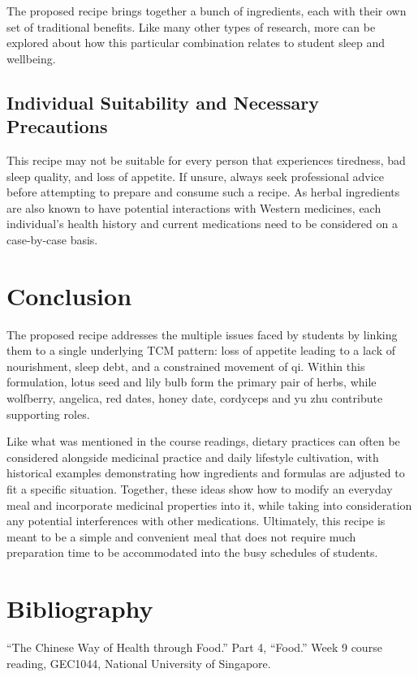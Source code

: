\documentclass[12pt,a4paper]{article}
\begin{document}
The proposed recipe brings together a bunch of ingredients, each with their own set of traditional benefits. Like many other types of research, more can be explored about how this particular combination relates to student sleep and wellbeing.

\subsection{Individual Suitability and Necessary Precautions}
This recipe may not be suitable for every person that experiences tiredness, bad sleep quality, and loss of appetite. If unsure, always seek professional advice before attempting to prepare and consume such a recipe. As herbal ingredients are also known to have potential interactions with Western medicines, each individual's health history and current medications need to be considered on a case-by-case basis.


\newpage
\section{Conclusion}
The proposed recipe addresses the multiple issues faced by students by linking them to a single underlying TCM pattern: loss of appetite leading to a lack of nourishment, sleep debt, and a constrained movement of qi. Within this formulation, lotus seed and lily bulb form the primary pair of herbs, while wolfberry, angelica, red dates, honey date, cordyceps and yu zhu contribute supporting roles.

Like what was mentioned in the course readings, dietary practices can often be considered alongside medicinal practice and daily lifestyle cultivation, with historical examples demonstrating how ingredients and formulas are adjusted to fit a specific situation. Together, these ideas show how to modify an everyday meal and incorporate medicinal properties into it, while taking into consideration any potential interferences with other medications. Ultimately, this recipe is meant to be a simple and convenient meal that does not require much preparation time to be accommodated into the busy schedules of students.

\newpage
\section{Bibliography}

“The Chinese Way of Health through Food.” Part 4, “Food.” Week 9 course reading, GEC1044, National University of Singapore.
\end{document}
